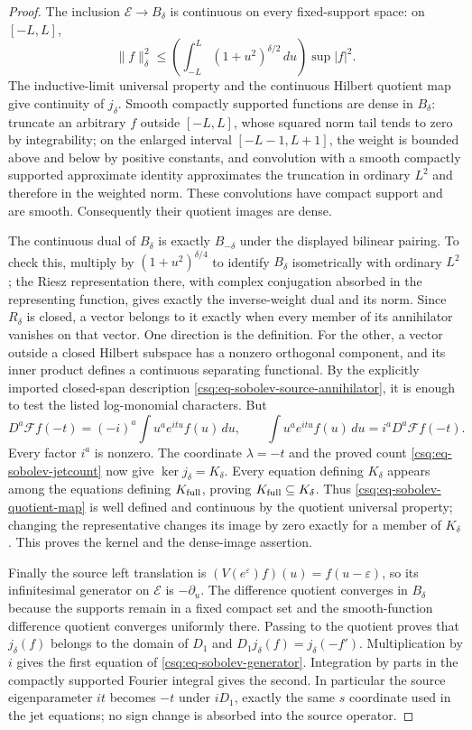 \begin{proof}
The inclusion $\mathcal E\to B_\delta$ is continuous on every
fixed-support space: on $[-L,L]$,
\[
 \|f\|_\delta^2\leq
   \left(\int_{-L}^L(1+u^2)^{\delta/2}\,du\right)\sup|f|^2.
\]
The inductive-limit universal property and the continuous Hilbert
quotient map give continuity of $j_\delta$.
Smooth compactly supported functions are dense in $B_\delta$:
truncate an arbitrary $f$ outside $[-L,L]$, whose squared norm tail
tends to zero by integrability; on the enlarged interval
$[-L-1,L+1]$, the weight is bounded above and below by positive
constants, and convolution with a smooth compactly supported
approximate identity approximates the truncation in ordinary $L^2$
and therefore in the weighted norm. These convolutions have compact
support and are smooth. Consequently their quotient images are dense.

The continuous dual of $B_\delta$ is exactly $B_{-\delta}$ under
the displayed bilinear pairing. To check this, multiply by
$(1+u^2)^{\delta/4}$ to identify $B_\delta$ isometrically with
ordinary $L^2$; the Riesz representation there, with complex
conjugation absorbed in the representing function, gives exactly
the inverse-weight dual and its norm. Since $R_\delta$ is closed,
a vector belongs to it exactly when every member of its annihilator
vanishes on that vector. One direction is the definition. For the
other, a vector outside a closed Hilbert subspace has a nonzero
orthogonal component, and its inner product defines a continuous
separating functional. By the explicitly imported closed-span
description \eqref{csq:eq-sobolev-source-annihilator}, it is enough
to test the listed log-monomial characters. But
\[
 D^a\mathscr Ff(-t)=(-i)^a\int u^a e^{itu}f(u)\,du,
 \qquad
 \int u^a e^{itu}f(u)\,du=i^aD^a\mathscr Ff(-t).
\]
Every factor $i^a$ is nonzero. The coordinate $\lambda=-t$ and
the proved count \eqref{csq:eq-sobolev-jetcount} now give
$\ker j_\delta=K_\delta$. Every equation defining $K_\delta$
appears among the equations defining $K_{\rm full}$, proving
$K_{\rm full}\subseteq K_\delta$. Thus
\eqref{csq:eq-sobolev-quotient-map} is well defined and continuous
by the quotient universal property; changing the representative
changes its image by zero exactly for a member of $K_\delta$.
This proves the kernel and the dense-image assertion.

Finally the source left translation is
$(V(e^\varepsilon)f)(u)=f(u-\varepsilon)$, so its infinitesimal
generator on $\mathcal E$ is $-\partial_u$. The difference quotient
converges in $B_\delta$ because the supports remain in a fixed
compact set and the smooth-function difference quotient converges
uniformly there. Passing to the quotient proves that
$j_\delta(f)$ belongs to the domain of $D_1$ and
$D_1j_\delta(f)=j_\delta(-f')$. Multiplication by $i$ gives the
first equation of \eqref{csq:eq-sobolev-generator}. Integration by
parts in the compactly supported Fourier integral gives the second.
In particular the source eigenparameter $it$ becomes $-t$ under
$iD_1$, exactly the same $s$ coordinate used in the jet equations;
no sign change is absorbed into the source operator.
\end{proof}

